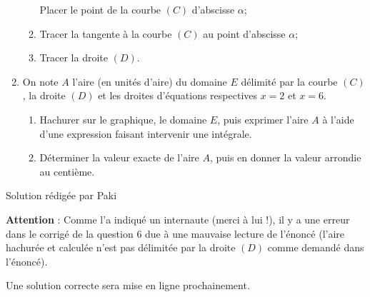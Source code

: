 \begin{enumerate}
\begin{enumerate}[label=\alph*.]
          Placer le point de la courbe $\left(C\right)$ d'abscisse $\alpha $;
          \item
          Tracer la tangente à la courbe $\left(C\right)$ au point d'abscisse $\alpha $;
          \item
     Tracer la droite $\left(D\right)$.\end{enumerate}
     \item
     On note $A$ l'aire (en unités d'aire) du domaine $E$ délimité par la courbe $\left(C\right)$, la droite $\left(D\right)$ et les droites d'équations respectives $x=2$ et $x=6$.
     \begin{enumerate}[label=\alph*.]
          \item
          Hachurer sur le graphique, le domaine $E$, puis exprimer l'aire  $A$ à l'aide d'une expression faisant intervenir une intégrale.
          \item
          Déterminer la valeur exacte de l'aire $A$, puis en donner la valeur arrondie au centième.
     \end{enumerate}
\end{enumerate}

\begin{center}
\end{center}

\begin{corrige}

     Solution rédigée par Paki
     \par
     \textbf{Attention} : Comme l'a indiqué un internaute (merci à lui !), il y a une erreur dans le corrigé de la question 6 due à une mauvaise lecture de l'énoncé (l'aire hachurée et calculée n'est pas délimitée par la droite $\left(D\right)$ comme demandé dans l'énoncé).
     \par
     Une solution correcte sera mise en ligne prochainement.
\begin{center}
\end{center}
\end{corrige}

